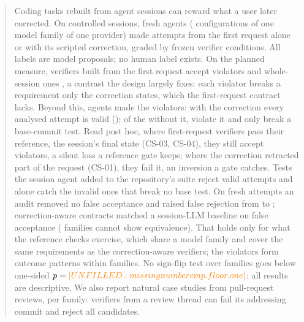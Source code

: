 \begin{abstract}
Coding tasks rebuilt from agent sessions can reward what a user later corrected. On  controlled sessions, fresh agents ( configurations of one model family of one provider) made  attempts from the first request alone or with its scripted correction, graded by  frozen verifier conditions. All labels are model proposals; no human label exists. On the planned measure, verifiers built from the first request accept  violators and whole-session ones , a contrast the design largely fixes: each violator breaks a requirement only the correction states, which the first-request contract lacks. Beyond this, agents made the violators: with the correction every analysed attempt is valid (); of the  without it,  violate it and  only break a base-commit test. Read post hoc, where first-request verifiers pass their reference, the session's final state (CS-03, CS-04), they still accept  violators, a silent loss a reference gate keeps; where the correction retracted part of the request (CS-01), they fail it, an inversion a gate catches. Tests the session agent added to the repository's suite reject  valid attempts and alone catch the  invalid ones that break no base test. On fresh attempts an audit removed no false acceptance and raised false rejection from  to ; correction-aware contracts matched a session-LLM baseline on false acceptance ( families cannot show equivalence). That  holds only for what the reference checks exercise, which share a model family and cover the same requirements as the correction-aware verifiers; the violators form  outcome patterns within families. No sign-flip test over  families goes below one-sided $p=\fv{cmp.floor.one}$: all results are descriptive. We also report  natural case studies from pull-request reviews, per family: verifiers from a review thread can fail its addressing commit and reject all candidates.
\end{abstract}
